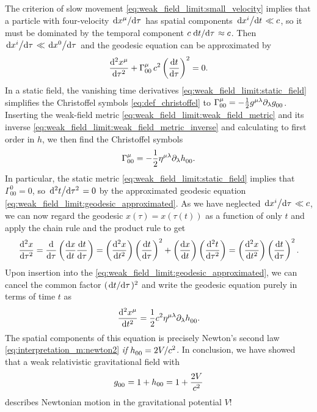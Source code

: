The criterion of slow movement \cref{eq:weak_field_limit:small_velocity} implies that a particle with four-velocity $\odv{x^\mu}/{\tau}$ has spatial components $\odv{x^i}/{t} \ll c$, so it must be dominated by the temporal component $c \odv{t}/{\tau} \approx c$.
Then $\odv{x^i}/{\tau} \ll \odv{x^0}/{\tau}$ and the geodesic equation can be approximated by
\begin{equation}
	\odv[2]{x^\mu}{\tau} + \Gamma^\mu_{00} \, c^2 \left( \odv{t}{\tau} \right)^2 = 0 .
	\label{eq:weak_field_limit:geodesic_approximated}
\end{equation}
In a static field, the vanishing time derivatives \eqref{eq:weak_field_limit:static_field} simplifies the Christoffel symbols \eqref{eq:def_christoffel} to $\Gamma^\mu_{00} = -\frac{1}{2} g\indices{^\mu^\lambda} \partial_\lambda g\indices{_0_0}$.
Inserting the weak-field metric \eqref{eq:weak_field_limit:weak_field_metric} and its inverse \eqref{eq:weak_field_limit:weak_field_metric_inverse} and calculating to first order in $h$, we then find the Christoffel symbols
\begin{equation}
	\Gamma^\mu_{00} = -\frac{1}{2} \eta\indices{^\mu^\lambda} \partial_\lambda h\indices{_0_0} .
	\label{eq:weak_field_limit:static_christoffel_symbols}
\end{equation}
In particular, the static metric \eqref{eq:weak_field_limit:static_field} implies that $\Gamma^0_{00} = 0$, so $\odv[2]{t}/{\tau} = 0$ by the approximated geodesic equation \eqref{eq:weak_field_limit:geodesic_approximated}.
As we have neglected $\odv{x^i}/{\tau} \ll c$, we can now regard the geodesic $x(\tau) = x(\tau(t))$ as a function of only $t$ and apply the chain rule and the product rule to get 
\begin{equation}
	\odv[2]{x}{\tau} = \odv*{\left( \odv{x}{t} \odv{t}{\tau} \right)}{\tau} = \left( \odv[2]{x}{t} \right) \left( \odv{t}{\tau} \right)^2 + \left( \odv{x}{t} \right) \left( \odv[2]{t}{\tau} \right) = \left( \odv[2]{x}{t} \right) \left( \odv{t}{\tau} \right)^2 .
\end{equation}
Upon insertion into the \cref{eq:weak_field_limit:geodesic_approximated}, we can cancel the common factor $(\odv{t}/{\tau})^2$ and write the geodesic equation purely in terms of time $t$ as
\begin{equation*}
	\odv[2]{x^\mu}{t} = \frac{1}{2} c^2 \eta\indices{^\mu^\lambda} \partial_\lambda h\indices{_0_0} .
\end{equation*}
The spatial components of this equation is precisely Newton's second law \eqref{eq:interpretation_m:newton2} \emph{if} $h\indices{_0_0} = 2V/c^2$.
In conclusion, we have showed that a weak relativistic gravitational field with
\begin{equation}
	g\indices{_0_0} = 1 + h_{00} = 1 + \frac{2V}{c^2} 
	\label{eq:weak_field_limit:metric_with_potential}
\end{equation}
describes Newtonian motion in the gravitational potential $V$!

